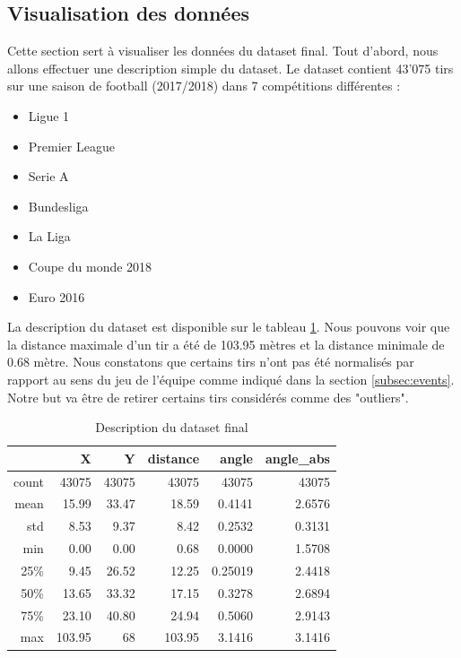 \documentclass[12pt]{article}
\begin{document}
\subsection{Visualisation des données}
Cette section sert à visualiser les données du dataset final.
Tout d'abord, nous allons effectuer une description simple du dataset.
Le dataset contient 43'075 tirs sur une saison de football (2017/2018) dans 7 compétitions différentes :
\begin{itemize}
    \item Ligue 1
    \item Premier League
    \item Serie A
    \item Bundesliga
    \item La Liga
    \item Coupe du monde 2018
    \item Euro 2016
\end{itemize}
La description du dataset est disponible sur le tableau \ref{tab:describe_dataset}.
Nous pouvons voir que la distance maximale d'un tir a été de 103.95 mètres et la distance minimale de 0.68 mètre.
Nous constatons que certains tirs n'ont pas été normalisés par rapport au sens du jeu de l'équipe comme indiqué dans la section \ref{subsec:events}.
Notre but va être de retirer certains tirs considérés comme des "outliers".
\begin{table}[htp]
    \centering
    \begin{tabular}{r|r|r|r|r|r|}
        \cline{2-6}
        \textbf{}                   & \textbf{X} & \textbf{Y} & \textbf{distance} & \textbf{angle} & \textbf{angle\_abs} \\ \hline
        \multicolumn{1}{|r|}{count} & 43075      & 43075      & 43075             & 43075          & 43075               \\ \hline
        \multicolumn{1}{|r|}{mean}  & 15.99      & 33.47      & 18.59             & 0.4141         & 2.6576              \\ \hline
        \multicolumn{1}{|r|}{std}   & 8.53       & 9.37       & 8.42              & 0.2532         & 0.3131              \\ \hline
        \multicolumn{1}{|r|}{min}   & 0.00       & 0.00       & 0.68              & 0.0000         & 1.5708              \\ \hline
        \multicolumn{1}{|r|}{25\%}  & 9.45       & 26.52      & 12.25             & 0.25019        & 2.4418              \\ \hline
        \multicolumn{1}{|r|}{50\%}  & 13.65      & 33.32      & 17.15             & 0.3278         & 2.6894              \\ \hline
        \multicolumn{1}{|r|}{75\%}  & 23.10      & 40.80      & 24.94             & 0.5060         & 2.9143              \\ \hline
        \multicolumn{1}{|r|}{max}   & 103.95     & 68         & 103.95            & 3.1416         & 3.1416              \\ \hline
    \end{tabular}
    \caption{Description du dataset final}
    \label{tab:describe_dataset}
\end{table}
\end{document}
